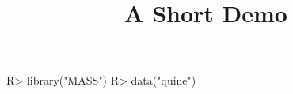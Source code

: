 \documentclass[article]{jss}
\title{A Short Demo}
\begin{document}
\begin{CodeInput}
R> library("MASS")
R> data("quine")
\end{CodeInput}
\end{document}
